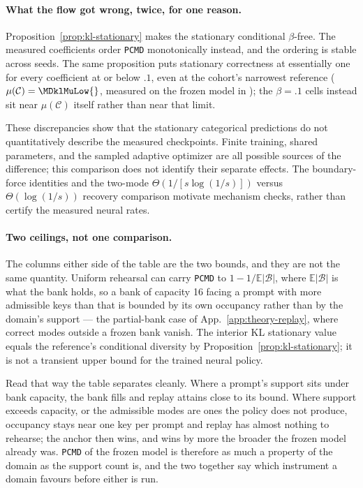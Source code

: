 \documentclass{article}
\newcommand{\1}{\mathbf 1}
\newcommand{\E}{\mathbb E}
\newcommand{\pmd}{\texttt{PCMD}}
\theoremstyle{remark}
\theoremstyle{definition}
\theoremstyle{plain}
\begin{document}
\paragraph{What the flow got wrong, twice, for one reason.}
Proposition~\ref{prop:kl-stationary} makes the stationary conditional
$\beta$-free. The measured coefficients order \pmd{} monotonically instead, and
the ordering is stable across seeds. The same proposition puts stationary
correctness at essentially one for every coefficient at or below $.1$, even at
the cohort's narrowest reference ($\mu(\mathcal C)=\MDklMuLow{}$, measured on
the frozen model in \MDklMuLowDomain{}); the $\beta=.1$ cells instead sit near
$\mu(\mathcal C)$ itself rather than near that limit.

These discrepancies show that the stationary categorical predictions do
not quantitatively describe the measured checkpoints. Finite training,
shared parameters, and the sampled adaptive optimizer are all possible
sources of the difference; this comparison does not identify their separate
effects. The boundary-force identities and the two-mode
$\Theta(1/[s\log(1/s)])$ versus $\Theta(\log(1/s))$ recovery comparison
motivate mechanism checks, rather than certify the measured neural rates.

\paragraph{Two ceilings, not one comparison.}
The columns either side of the table are the two bounds, and they are not the
same quantity. Uniform rehearsal can carry \pmd{} to $1-1/\E|\mathcal B|$,
where $\E|\mathcal B|$ is what the bank holds, so a bank of capacity 16 facing
a prompt with more admissible keys than that is bounded by its own occupancy
rather than by the domain's support --- the partial-bank case of
App.~\ref{app:theory-replay}, where correct modes outside a frozen bank vanish.
The interior KL stationary value equals the reference's conditional
diversity by Proposition~\ref{prop:kl-stationary}; it is not a transient
upper bound for the trained neural policy.

Read that way the table separates cleanly. Where a prompt's support sits under
bank capacity, the bank fills and replay attains close to its bound. Where
support exceeds capacity, or the admissible modes are ones the policy does not
produce, occupancy stays near one key per prompt and replay has almost nothing
to rehearse; the anchor then wins, and wins by more the broader the frozen
model already was. \pmd{} of the frozen model is therefore as much a property
of the domain as the support count is, and the two together say which
instrument a domain favours before either is run.
\end{document}
